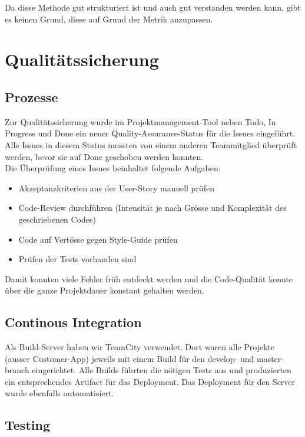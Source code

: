 Da diese Methode gut strukturiert ist und auch gut verstanden werden kann, gibt es keinen Grund, diese auf Grund der Metrik anzupassen.

\section{Qualitätssicherung}

\label{quality-assurance}

\subsection{Prozesse}

Zur Qualitätssicherung wurde im Projektmanagement-Tool neben Todo, In Progress und Done ein neuer Quality-Assurance-Status für die Issues eingeführt. Alle Issues in diesem Status mussten von einem anderen Teammitglied überprüft werden, bevor sie auf Done geschoben werden konnten. \\

Die Überprüfung eines Issues beinhaltet folgende Aufgaben:

\begin{itemize}
	\item{Akzeptanzkriterien aus der User-Story manuell prüfen}
	\item{Code-Review durchführen (Intensität je nach Grösse und Komplexität des geschriebenen Codes)}
	\item{Code auf Vertösse gegen Style-Guide prüfen}
	\item{Prüfen der Tests vorhanden sind}
\end{itemize}

Damit konnten viele Fehler früh entdeckt werden und die Code-Qualität konnte über die ganze Projektdauer konstant gehalten werden.

\subsection{Continous Integration}

Als Build-Server haben wir TeamCity verwendet. Dort waren alle Projekte (ausser Customer-App) jeweils mit einem Build für den develop- und master-branch eingerichtet. Alle Builds führten die nötigen Tests aus und produzierten ein entsprechendes Artifact für das Deployment. Das Deployment für den Server wurde ebenfalls automatisiert.

\subsection{Testing}

